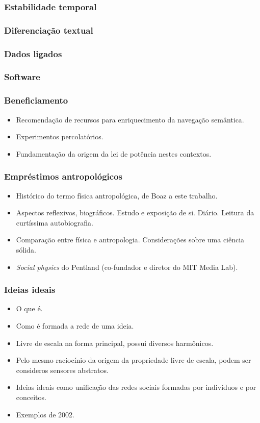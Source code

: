 \documentclass[10pt]{beamer}
\begin{document}
\begin{frame}
\frametitle{Estabilidade temporal}
\end{frame}

\begin{frame}
\frametitle{Diferenciação textual}
\end{frame}

\begin{frame}
\frametitle{Dados ligados}
\end{frame}

\begin{frame}
\frametitle{Software}
\end{frame}

\begin{frame}
\frametitle{Beneficiamento}
\begin{itemize}
	\item Recomendação de recursos para enriquecimento da navegação semântica.
	\item Experimentos percolatórios.
	\item Fundamentação da origem da lei de potência nestes contextos.
\end{itemize}
\end{frame}

\begin{frame}
\frametitle{Empréstimos antropológicos}
\begin{itemize}
\item Histórico do termo física antropológica, de Boaz a este trabalho.
\item Aspectos reflexivos, biográficos. Estudo e exposição de si. Diário. Leitura da curtíssima autobiografia.
\item Comparação entre física e antropologia. Considerações sobre uma ciência sólida.
\item \emph{Social physics} do Pentland (co-fundador e diretor do MIT Media Lab).
\end{itemize}
\end{frame}

\begin{frame}
\frametitle{Ideias ideais}
\begin{itemize}
\item O que é.
\item Como é formada a rede de uma ideia.
\item Livre de escala na forma principal, possui diversos harmônicos.
\item Pelo mesmo raciocínio da origem da propriedade livre de escala, podem ser consideros sensores abstratos.
\item Ideias ideais como unificação das redes sociais formadas por indivíduos e por conceitos.
\item Exemplos de 2002.
\end{itemize}
\end{frame}
\end{document}
